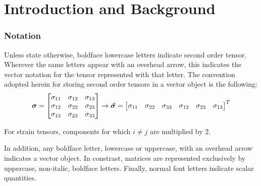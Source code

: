 \chapter{Introduction and Background}


\subsection{Notation}
Unless state otherwise, boldface lowercase letters indicate second order 
tensor. Wherever 
the same letters appear with an overhead arrow, this indicates the vector 
notation for the tensor represented with that letter. The convention adopted 
herein for storing second order tensors in a vector object is the following:
\begin{equation*}
	\boldsymbol{\sigma} = \begin{bmatrix}
		\sigma_{11} & \sigma_{12} & \sigma_{13} \\
		\sigma_{12} & \sigma_{22} & \sigma_{23} \\
		\sigma_{13} & \sigma_{23} & \sigma_{33} \\
	\end{bmatrix}\rightarrow \vec{\boldsymbol{\sigma}} = \begin{bmatrix}
		\sigma_{11} & \sigma_{22} & \sigma_{33} & \sigma_{12} & \sigma_{23} & 
		\sigma_{13}
	\end{bmatrix}^T
\end{equation*}

For strain tensors, components for which $i\neq j$ are multiplied by 2.

In addition, any boldface letter, lowercase or uppercase, with an overhead 
arrow indicates a vector object. In constrast, matrices are represented 
exclusively by uppercase, non-italic, boldface letters. Finally, normal font 
letters indicate scalar quantities.